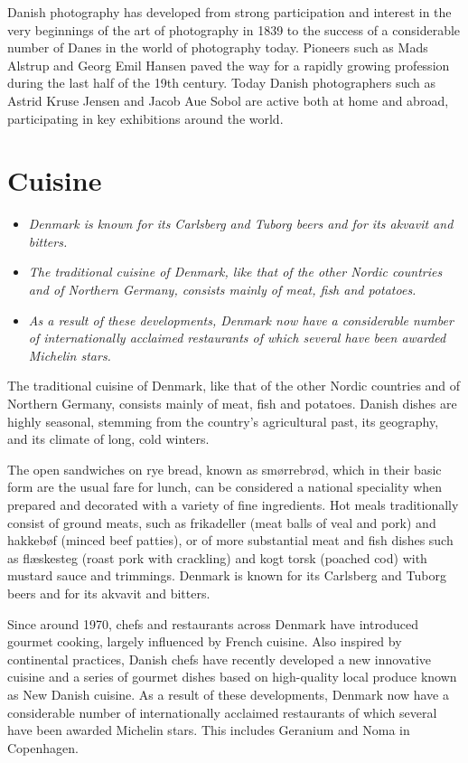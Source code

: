 Danish photography has developed from strong participation and interest
in the very beginnings of the art of photography in 1839 to the success
of a considerable number of Danes in the world of photography today.
Pioneers such as Mads Alstrup and Georg Emil Hansen paved the way for a
rapidly growing profession during the last half of the 19th century.
Today Danish photographers such as Astrid Kruse Jensen and Jacob Aue
Sobol are active both at home and abroad, participating in key
exhibitions around the world.

\section{Cuisine}\label{cuisine}

\begin{itemize}
\item
  \emph{Denmark is known for its Carlsberg and Tuborg beers and for its
  akvavit and bitters.}
\item
  \emph{The traditional cuisine of Denmark, like that of the other
  Nordic countries and of Northern Germany, consists mainly of meat,
  fish and potatoes.}
\item
  \emph{As a result of these developments, Denmark now have a
  considerable number of internationally acclaimed restaurants of which
  several have been awarded Michelin stars.}
\end{itemize}

The traditional cuisine of Denmark, like that of the other Nordic
countries and of Northern Germany, consists mainly of meat, fish and
potatoes. Danish dishes are highly seasonal, stemming from the country's
agricultural past, its geography, and its climate of long, cold winters.

The open sandwiches on rye bread, known as smørrebrød, which in their
basic form are the usual fare for lunch, can be considered a national
speciality when prepared and decorated with a variety of fine
ingredients. Hot meals traditionally consist of ground meats, such as
frikadeller (meat balls of veal and pork) and hakkebøf (minced beef
patties), or of more substantial meat and fish dishes such as flæskesteg
(roast pork with crackling) and kogt torsk (poached cod) with mustard
sauce and trimmings. Denmark is known for its Carlsberg and Tuborg beers
and for its akvavit and bitters.

Since around 1970, chefs and restaurants across Denmark have introduced
gourmet cooking, largely influenced by French cuisine. Also inspired by
continental practices, Danish chefs have recently developed a new
innovative cuisine and a series of gourmet dishes based on high-quality
local produce known as New Danish cuisine. As a result of these
developments, Denmark now have a considerable number of internationally
acclaimed restaurants of which several have been awarded Michelin stars.
This includes Geranium and Noma in Copenhagen.

